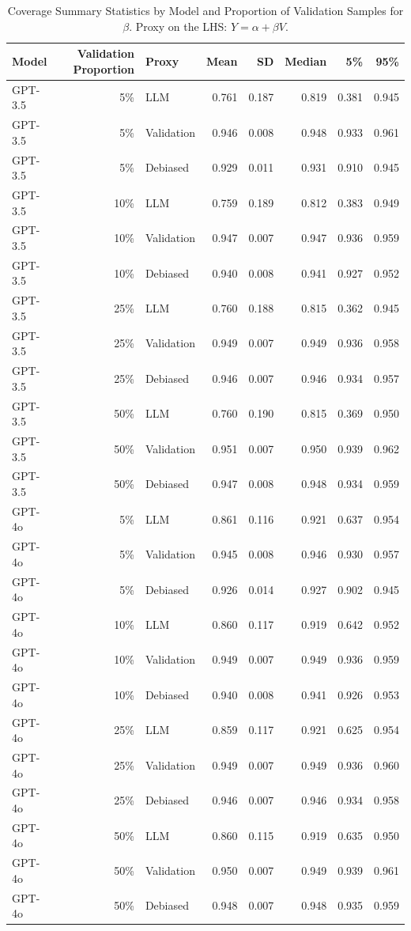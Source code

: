\begin{table}

\caption{Coverage Summary Statistics by Model and Proportion of Validation Samples for $\beta$. Proxy on the LHS: $Y = \alpha + \beta V$.}
\centering
\begin{tabular}[t]{lrlrrrrr}
\toprule
Model & Validation Proportion & Proxy & Mean & SD & Median & 5\% & 95\%\\
\midrule
GPT-3.5 & 5\% & LLM & 0.761 & 0.187 & 0.819 & 0.381 & 0.945\\
GPT-3.5 & 5\% & Validation & 0.946 & 0.008 & 0.948 & 0.933 & 0.961\\
GPT-3.5 & 5\% & Debiased & 0.929 & 0.011 & 0.931 & 0.910 & 0.945\\
GPT-3.5 & 10\% & LLM & 0.759 & 0.189 & 0.812 & 0.383 & 0.949\\
GPT-3.5 & 10\% & Validation & 0.947 & 0.007 & 0.947 & 0.936 & 0.959\\
GPT-3.5 & 10\% & Debiased & 0.940 & 0.008 & 0.941 & 0.927 & 0.952\\
GPT-3.5 & 25\% & LLM & 0.760 & 0.188 & 0.815 & 0.362 & 0.945\\
GPT-3.5 & 25\% & Validation & 0.949 & 0.007 & 0.949 & 0.936 & 0.958\\
GPT-3.5 & 25\% & Debiased & 0.946 & 0.007 & 0.946 & 0.934 & 0.957\\
GPT-3.5 & 50\% & LLM & 0.760 & 0.190 & 0.815 & 0.369 & 0.950\\
GPT-3.5 & 50\% & Validation & 0.951 & 0.007 & 0.950 & 0.939 & 0.962\\
GPT-3.5 & 50\% & Debiased & 0.947 & 0.008 & 0.948 & 0.934 & 0.959\\
GPT-4o & 5\% & LLM & 0.861 & 0.116 & 0.921 & 0.637 & 0.954\\
GPT-4o & 5\% & Validation & 0.945 & 0.008 & 0.946 & 0.930 & 0.957\\
GPT-4o & 5\% & Debiased & 0.926 & 0.014 & 0.927 & 0.902 & 0.945\\
GPT-4o & 10\% & LLM & 0.860 & 0.117 & 0.919 & 0.642 & 0.952\\
GPT-4o & 10\% & Validation & 0.949 & 0.007 & 0.949 & 0.936 & 0.959\\
GPT-4o & 10\% & Debiased & 0.940 & 0.008 & 0.941 & 0.926 & 0.953\\
GPT-4o & 25\% & LLM & 0.859 & 0.117 & 0.921 & 0.625 & 0.954\\
GPT-4o & 25\% & Validation & 0.949 & 0.007 & 0.949 & 0.936 & 0.960\\
GPT-4o & 25\% & Debiased & 0.946 & 0.007 & 0.946 & 0.934 & 0.958\\
GPT-4o & 50\% & LLM & 0.860 & 0.115 & 0.919 & 0.635 & 0.950\\
GPT-4o & 50\% & Validation & 0.950 & 0.007 & 0.949 & 0.939 & 0.961\\
GPT-4o & 50\% & Debiased & 0.948 & 0.007 & 0.948 & 0.935 & 0.959\\
\bottomrule
\end{tabular}
\end{table}
